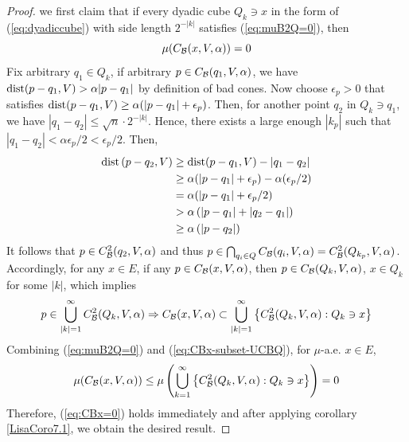 \begin{proof}
    we first claim that if every dyadic cube $Q_k\ni x$ in the form of (\ref{eq:dyadiccube}) with side length $2^{-|k|}$ satisfies (\ref{eq:muB2Q=0}), 
    then
    \begin{equation}\label{eq:CBx=0}
        \mu(C_\mathcal B(x, V, \alpha)) = 0
    \end{equation}
    Fix arbitrary $q_1\in Q_k$, if arbitrary $p\in C_\mathcal B(q_1, V, \alpha)$, we have $\operatorname{dist}(p-q_1, V) > \alpha|p-q_1|$ by definition of bad cones. Now choose $\epsilon_p>0$ that satisfies $\operatorname{dist}(p-q_1, V) \geq \alpha (|p-q_1|+\epsilon_p)$. Then, for another point $q_2$ in $Q_k\ni q_1$, we have $|q_1-q_2|\leq \sqrt{n}\cdot 2^{-|k|}$. Hence, there exists a large enough $|k_p|$ such that $|q_1-q_2|<\alpha\epsilon_p/2<\epsilon_p/2$. Then,
    \begin{equation*}
        \begin{aligned} 
            \operatorname{dist}\left(p-q_2, V\right) & \geq \operatorname{dist}(p-q_1, V)-\left|q_1-q_2\right| \\ 
            & \geq \alpha(|p-q_1|+\epsilon_p)-\alpha(\epsilon_p / 2) \\ 
            & =\alpha(|p-q_1|+\epsilon_p / 2) \\ 
            & >\alpha\left(|p-q_1|+\left|q_2-q_1\right|\right) \\ 
            & \geq \alpha\left(\left|p-q_2\right|\right) 
    \end{aligned}
    \end{equation*}
    It follows that $p\in C_{\mathcal B}^2(q_2, V, \alpha)$ and thus $p\in \bigcap_{q_i\in Q}C_\mathcal B(q_i, V, \alpha) = C_\mathcal B^2(Q_{k_p}, V, \alpha)$. Accordingly, for any $x\in E$, if any $p\in C_\mathcal B(x, V, \alpha)$, then $p\in C_\mathcal B(Q_k, V, \alpha)$, $x\in Q_k$ for some $|k|$, which implies
    \begin{equation}\label{eq:CBx-subset-UCBQ}
        p\in \bigcup_{|k|=1}^\infty C_\mathcal B^2(Q_k, V, \alpha)\Rightarrow C_\mathcal B(x, V, \alpha)\subset \bigcup_{|k|=1}^\infty \left\{C_\mathcal B^2(Q_k, V, \alpha): Q_k\ni x\right\}
    \end{equation}
    Combining (\ref{eq:muB2Q=0}) and (\ref{eq:CBx-subset-UCBQ}), for $\mu$-a.e. $x\in E$,
    \begin{equation*}
        \mu(C_\mathcal B(x, V, \alpha)) \leq \mu\left(\bigcup_{k=1}^\infty  \left\{C_\mathcal B^2(Q_k, V, \alpha): Q_k\ni x \right \}\right) = 0
    \end{equation*}
    Therefore, (\ref{eq:CBx=0}) holds immediately and after applying corollary \ref{LisaCoro7.1}, we obtain the desired result.
\end{proof}

